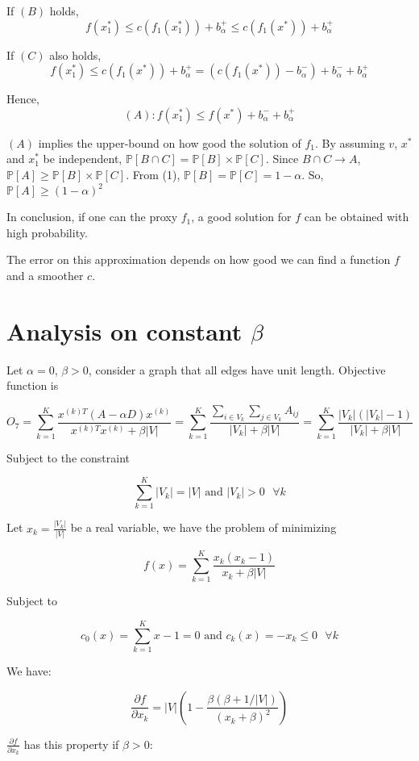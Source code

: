 If $(B)$ holds, 
\[
f(x^*_1) \leq c(f_1(x^*_1)) + b_\alpha^+ \leq c(f_1(x^*)) + b_\alpha^+
\]

If $(C)$ also holds,
\[
f(x^*_1) \leq c(f_1(x^*)) + b_\alpha^+ = (c(f_1(x^*)) - b_\alpha^-) + b_\alpha^- + b_\alpha^+
\]

Hence, 
\[
(A): f(x^*_1) \leq f(x^*) + b_\alpha^- + b_\alpha^+
\]


$(A)$ implies the upper-bound on how good the solution of $f_1$. By assuming $v$, $x^*$ and $x^*_1$ be independent, $\mathbb{P}[B \cap C] = \mathbb{P}[B] \times \mathbb{P}[C]$. Since $B \cap C \to A$, $\mathbb{P}[A] \geq \mathbb{P}[B] \times \mathbb{P}[C]$. From (1), $\mathbb{P}[B] = \mathbb{P}[C] = 1 - \alpha$. So, $\mathbb{P}[A] \geq (1 - \alpha)^2$

In conclusion, if one can the proxy $f_1$, a good solution for $f$ can be obtained with high probability.

The error on this approximation depends on how good we can find a function $f$ and a smoother $c$.

\section{Analysis on constant $\beta$}

Let $\alpha = 0$, $\beta > 0$, consider a graph that all edges have unit length. Objective function is

\[
O_7 = \sum_{k=1}^{K} \frac{x^{(k)T} (A - \alpha D) x^{(k)}}{x^{(k)T} x^{(k)} + \beta |V|}
=
\sum_{k=1}^{K} \frac{\sum_{i \in V_k} \sum_{j \in V_k} A_{ij}}{|V_k| + \beta |V|}
= 
\sum_{k=1}^{K} \frac{|V_k|(|V_k| - 1)}{|V_k| + \beta |V|}
\]

Subject to the constraint

\[
\sum_{k=1}^{K} |V_k| = |V| \text{ and } |V_k| > 0 \text{ } \forall k
\]

Let $x_k = \frac{|V_k|}{|V|}$ be a real variable, we have the problem of minimizing

\[
f(x) = \sum_{k=1}^{K} \frac{x_k (x_k-1)}{x_k+\beta |V|}
\]

Subject to 

\[
c_0(x) = \sum_{k=1}^{K} x - 1 = 0 \text{ and } c_k(x) = -x_k \leq 0 \text{ } \forall k
\]

We have:

\[
\frac{\partial f}{\partial x_k} = |V|(1 - \frac{\beta (\beta + 1/|V|)}{(x_k + \beta)^2})
\]


$\frac{\partial f}{\partial x_k}$ has this property if $\beta > 0$:

